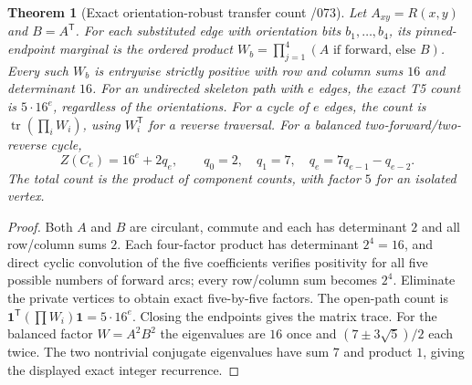 \documentclass[11pt]{article}
\newtheorem{theorem}{Theorem}
\begin{document}
\begin{theorem}[Exact orientation-robust transfer count /073]
Let $A_{xy}=R(x,y)$ and $B=A^{\mathsf T}$.
For each substituted edge with orientation bits
$b_1,\ldots,b_4$, its pinned-endpoint marginal is the
ordered product $W_b=\prod_{j=1}^4(A\text{ if forward, else }B)$.
Every such $W_b$ is entrywise strictly positive with row and
column sums $16$ and determinant $16$. For an undirected
skeleton path with $e$ edges, the exact T5 count is
$5\cdot16^e$, regardless of the orientations. For a cycle
of $e$ edges, the count is $\operatorname{tr}(\prod_i W_i)$,
using $W_i^{\mathsf T}$ for a reverse traversal.
For a balanced two-forward/two-reverse cycle,
\[
 Z(C_e)=16^e+2q_e,\qquad q_0=2,\quad q_1=7,\quad
 q_e=7q_{e-1}-q_{e-2}.
\]
The total count is the product of component counts,
with factor $5$ for an isolated vertex.
\end{theorem}
\begin{proof}
Both $A$ and $B$ are circulant, commute and each has determinant
$2$ and all row/column sums $2$. Each four-factor product has
determinant $2^4=16$, and direct cyclic convolution of the
five coefficients verifies positivity for all five possible
numbers of forward arcs; every row/column sum becomes $2^4$.
Eliminate the private vertices to obtain exact five-by-five
factors. The open-path count is
$\mathbf1^{\mathsf T}(\prod W_i)\mathbf1=5\cdot16^e$.
Closing the endpoints gives the matrix trace.
For the balanced factor $W=A^2B^2$ the eigenvalues are
$16$ once and $(7\pm3\sqrt5)/2$ each twice.
The two nontrivial conjugate eigenvalues have sum $7$ and
product $1$, giving the displayed exact integer recurrence.
\end{proof}
\end{document}
